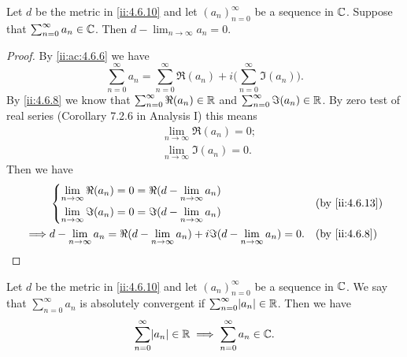 \begin{ac}\label{ii:ac:4.6.7}
  Let \(d\) be the metric in \cref{ii:4.6.10} and let \((a_n)_{n = 0}^\infty\) be a sequence in \(\mathbb{C}\).
  Suppose that \(\sum_{n = 0}^\infty a_n \in \mathbb{C}\).
  Then \(d - \lim_{n \to \infty} a_n = 0\).
\end{ac}

\begin{proof}
  By \cref{ii:ac:4.6.6} we have
  \[
    \sum_{n = 0}^\infty a_n = \sum_{n = 0}^\infty \Re(a_n) + i \bigg(\sum_{n = 0}^\infty \Im(a_n)\bigg).
  \]
  By \cref{ii:4.6.8} we know that \(\sum_{n = 0}^\infty \Re(a_n) \in \mathbb{R}\) and \(\sum_{n = 0}^\infty \Im(a_n) \in \mathbb{R}\).
  By zero test of real series (Corollary 7.2.6 in Analysis I) this means
  \begin{align*}
     & \lim_{n \to \infty} \Re(a_n) = 0; \\
     & \lim_{n \to \infty} \Im(a_n) = 0.
  \end{align*}
  Then we have
  \begin{align*}
             & \begin{dcases}
                 \lim_{n \to \infty} \Re(a_n) = 0 = \Re(d - \lim_{n \to \infty} a_n) \\
                 \lim_{n \to \infty} \Im(a_n) = 0 = \Im(d - \lim_{n \to \infty} a_n)
               \end{dcases}                                   &  & \by{ii:4.6.13}                                                         \\
    \implies & d - \lim_{n \to \infty} a_n = \Re(d - \lim_{n \to \infty} a_n) + i \Im(d - \lim_{n \to \infty} a_n) = 0. &  & \by{ii:4.6.8}
  \end{align*}
\end{proof}

\begin{ac}\label{ii:ac:4.6.8}
  Let \(d\) be the metric in \cref{ii:4.6.10} and let \((a_n)_{n = 0}^\infty\) be a sequence in \(\mathbb{C}\).
  We say that \(\sum_{n = 0}^\infty a_n\) is absolutely convergent if \(\sum_{n = 0}^\infty \abs{a_n} \in \R\).
  Then we have
  \[
    \sum_{n = 0}^\infty \abs{a_n} \in \R \implies \sum_{n = 0}^\infty a_n \in \C.
  \]
\end{ac}

